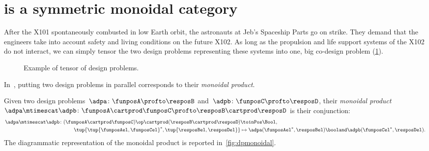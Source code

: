

\section[\DP is symmetric monoidal]{\DP is a symmetric monoidal category}
\label{sec:parallelism-DP-monoidal}


\begin{example}
    After the X101 spontaneously combusted in low Earth orbit, the astronauts at Jeb's Spaceship Parts go on strike.
    They demand that the engineers take into account safety and living conditions on the future X102.
    As long as the propulsion and life support systems of the X102 do not interact, we can simply tensor the two design problems representing these systems into one, big co-design problem (\cref{fig:examplemonoidal}).
    \begin{figure}[h!]
        \centering
        \caption{Example of tensor of design problems. }
        \label{fig:examplemonoidal}
    \end{figure}
\end{example}
In~\DP, putting two design problems in parallel corresponds to their \emph{monoidal product}.

\begin{definition}
    \label{def:monoidalproduct}
    Given two design problems~$\adpa \colon \funposA \profto \resposB$ and~$\adpb \colon \funposC \profto \resposD$, their \emph{monoidal product}~$\adpa \mtimescat \adpb \colon \funposA \cartprod \funposC \profto \resposB\cartprod \resposD$ is their conjunction:
    \begin{equation}
        \label{eq:monoidalprod_dp}
        \begin{aligned}
            \adpa \mtimescat \adpb \colon (\funposA \cartprod \funposC)\op \cartprod (\resposB \cartprod \resposD) & \toinPos \Bool, \\
            \tup{\tup{\funposAel,\funposCel}^*,\tup{\resposBel,\resposDel}} &\mapsto \adpa(\funposAel^*,\resposBel) \booland \adpb(\funposCel^*,\resposDel).
        \end{aligned}
    \end{equation}
    The diagrammatic representation of the monoidal product is reported in~\cref{fig:dpmonoidal}.
\end{definition}

